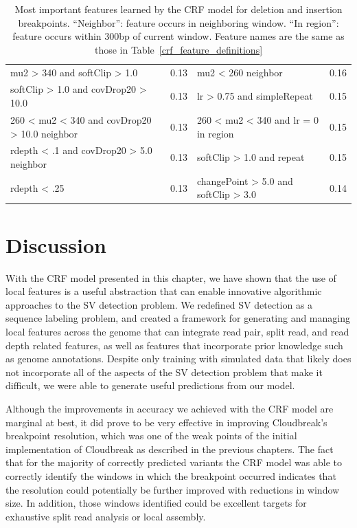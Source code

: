 \begin{table}
\begin{centering}
{\begin{tabular}{|lr|lr|}
mu2 > 340 and softClip > 1.0 & 0.13 & mu2 < 260 neighbor & 0.16 \\
softClip > 1.0 and covDrop20 > 10.0 & 0.13 & lr > 0.75 and simpleRepeat & 0.15 \\
260 < mu2 < 340 and covDrop20 > 10.0 neighbor & 0.13 & 260 < mu2 < 340 and lr = 0 in region & 0.15 \\
rdepth < .1 and covDrop20 > 5.0 neighbor & 0.13 & softClip > 1.0 and repeat & 0.15 \\
rdepth < .25 & 0.13 & changePoint > 5.0 and softClip > 3.0 & 0.14 \\
\hline
\end{tabular}
}
\caption[Most important features learned by the CRF model for deletion and insertion breakpoints.]{Most important features learned by the CRF model for deletion and insertion breakpoints. ``Neighbor'': feature occurs in neighboring window. ``In region'': feature occurs within 300bp of current window. Feature names are the same as those in Table~\ref{crf_feature_definitions}}
\end{centering}
\label{crf_feature_selections}
\end{table}

\section{Discussion}

With the CRF model presented in this chapter, we have shown that the use of local features is a useful abstraction that can enable innovative algorithmic approaches to the SV detection problem. We redefined SV detection as a sequence labeling problem, and created a framework for generating and managing local features across the genome that can integrate read pair, split read, and read depth related features, as well as features that incorporate prior knowledge such as genome annotations. Despite only training with simulated data that likely does not incorporate all of the aspects of the SV detection problem that make it difficult, we were able to generate useful predictions from our model.

Although the improvements in accuracy we achieved with the CRF model are marginal at best, it did prove to be very effective in improving Cloudbreak's breakpoint resolution, which was one of the weak points of the initial implementation of Cloudbreak as described in the previous chapters. The fact that for the majority of correctly predicted variants the CRF model was able to correctly identify the windows in which the breakpoint occurred indicates that the resolution could potentially be further improved with reductions in window size. In addition, those windows identified could be excellent targets for exhaustive split read analysis or local assembly.


